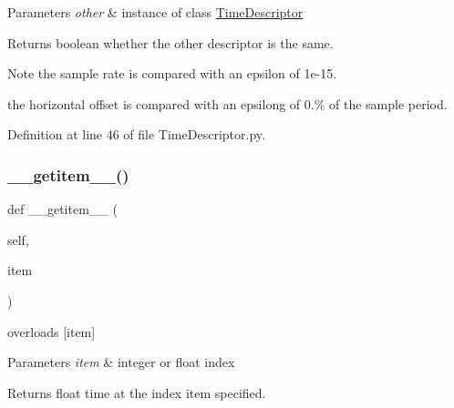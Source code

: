 \begin{DoxyParams}{Parameters}
{\em other} & instance of class \hyperlink{classSignalIntegrity_1_1TimeDomain_1_1Waveform_1_1TimeDescriptor_1_1TimeDescriptor}{Time\+Descriptor} \\
\hline
\end{DoxyParams}
\begin{DoxyReturn}{Returns}
boolean whether the other descriptor is the same. 
\end{DoxyReturn}
\begin{DoxyNote}{Note}
the sample rate is compared with an epsilon of 1e-\/15. 

the horizontal offset is compared with an epsilong of 0.\% of the sample period. 
\end{DoxyNote}


Definition at line 46 of file Time\+Descriptor.\+py.

\mbox{\label{classSignalIntegrity_1_1TimeDomain_1_1Waveform_1_1TimeDescriptor_1_1TimeDescriptor_aab91ae2e037c39b631a69273c277bfe9}} 
\subsubsection{\texorpdfstring{\+\_\+\+\_\+getitem\+\_\+\+\_\+()}{\_\_getitem\_\_()}}
{\footnotesize\ttfamily def \+\_\+\+\_\+getitem\+\_\+\+\_\+ (\begin{DoxyParamCaption}\item[{}]{self,  }\item[{}]{item }\end{DoxyParamCaption})}



overloads \mbox{[}item\mbox{]} 


\begin{DoxyParams}{Parameters}
{\em item} & integer or float index \\
\hline
\end{DoxyParams}
\begin{DoxyReturn}{Returns}
float time at the index item specified. 
\end{DoxyReturn}


